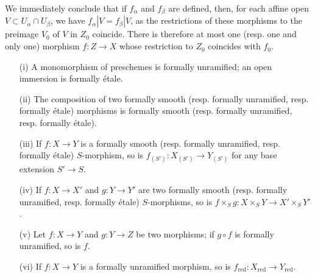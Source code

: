 \begin{remark}[17.1.2]
\begin{enumerate}
We immediately conclude that if $f_\alpha$ and $f_\beta$ are defined, then, for each affine open $V \subset U_\alpha \cap U_\beta$, we have $f_\alpha|V = f_\beta|V$, as the restrictions of these morphisms to the preimage $V_0$ of $V$ in $Z_0$ coincide.
There is therefore at most one (resp. one and only one) morphism $f : Z \to X$ whose restriction to $Z_0$ coincides with $f_0$.
\end{enumerate}
\end{remark}

\begin{proposition}[17.1.3]
\label{IV.17.1.3}
\begin{enumerate}
\item[(i)] A monomorphism of preschemes is formally unramified; an open immersion is formally \'etale.
\item[(ii)] The composition of two formally smooth (resp. formally unramified, resp. formally \'etale) morphisms is formally smooth (resp. formally unramified, resp. formally \'etale).
\item[(iii)] If $f:X\to Y$ is a formally smooth (resp. formally unramified, resp. formally \'etale) $S$-morphism, so is $f_{(S')}:X_{(S')}\to Y_{(S')}$ for any base extension $S'\to S$.
\item[(iv)] If $f: X \to X'$ and $g: Y \to Y'$ are two formally smooth (resp. formally unramified, resp. formally \'etale) $S$-morphisms, so is $f \times_{S} g: X\times_{S} Y \to X' \times_{S} Y'$.
\item[(v)] Let $f : X \to Y$ and $g : Y \to Z$ be two morphisms; if $g \circ f$ is formally unramified, so is $f$.
\item[(vi)] If $f : X \to Y$ is a formally unramified morphism, so is $f_{\mathrm{red}}: X_{\mathrm{red}} \to Y_{\mathrm{red}}$.
\end{enumerate}
\end{proposition}

